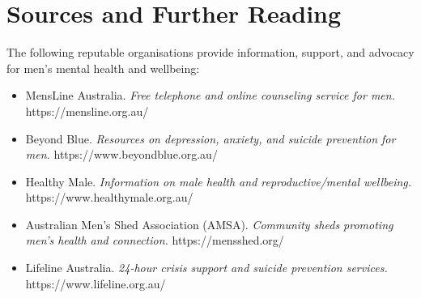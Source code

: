 \section*{Sources and Further Reading}
The following reputable organisations provide information, support, and advocacy for men's mental health and wellbeing:
\begin{itemize}
    \item MensLine Australia. \textit{Free telephone and online counseling service for men.} https://mensline.org.au/
    \item Beyond Blue. \textit{Resources on depression, anxiety, and suicide prevention for men.} https://www.beyondblue.org.au/
    \item Healthy Male. \textit{Information on male health and reproductive/mental wellbeing.} https://www.healthymale.org.au/
    \item Australian Men's Shed Association (AMSA). \textit{Community sheds promoting men's health and connection.} https://mensshed.org/
    \item Lifeline Australia. \textit{24-hour crisis support and suicide prevention services.} https://www.lifeline.org.au/
\end{itemize}
